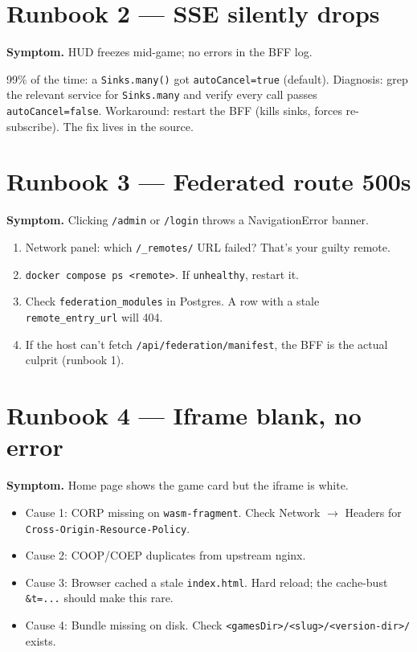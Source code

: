 \documentclass[11pt,a4paper,openany]{book}
\begin{document}
\chapter{Runbook 2 --- SSE silently drops}

\textbf{Symptom.} HUD freezes mid-game; no errors in the BFF log.

99\% of the time: a \texttt{Sinks.many()} got \texttt{autoCancel=true}
(default). Diagnosis: grep the relevant service for
\texttt{Sinks.many} and verify every call passes
\texttt{autoCancel=false}. Workaround: restart the BFF (kills sinks,
forces re-subscribe). The fix lives in the source.

\chapter{Runbook 3 --- Federated route 500s}
\textbf{Symptom.} Clicking \texttt{/admin} or \texttt{/login} throws a
NavigationError banner.

\begin{enumerate}
  \item Network panel: which \texttt{/\_remotes/} URL failed? That's
        your guilty remote.
  \item \texttt{docker compose ps <remote>}. If
        \texttt{unhealthy}, restart it.
  \item Check \texttt{federation\_modules} in Postgres. A row with a
        stale \texttt{remote\_entry\_url} will 404.
  \item If the host can't fetch \texttt{/api/federation/manifest}, the
        BFF is the actual culprit (runbook 1).
\end{enumerate}

\chapter{Runbook 4 --- Iframe blank, no error}
\textbf{Symptom.} Home page shows the game card but the iframe is
white.

\begin{itemize}
  \item Cause 1: CORP missing on \texttt{wasm-fragment}. Check
        Network $\rightarrow$ Headers for
        \texttt{Cross-Origin-Resource-Policy}.
  \item Cause 2: COOP/COEP duplicates from upstream nginx.
  \item Cause 3: Browser cached a stale \texttt{index.html}. Hard
        reload; the cache-bust \texttt{\&t=...} should make this rare.
  \item Cause 4: Bundle missing on disk. Check
        \texttt{<gamesDir>/<slug>/<version-dir>/} exists.
\end{itemize}
\end{document}
